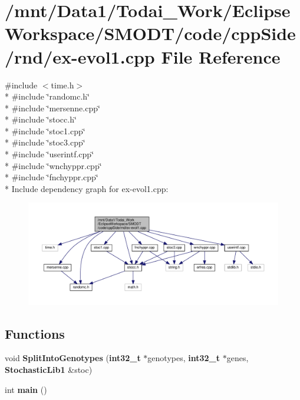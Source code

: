 \section{/mnt/\-Data1/\-Todai\-\_\-\-Work/\-Eclipse\-Workspace/\-S\-M\-O\-D\-T/code/cpp\-Side/rnd/ex-\/evol1.cpp File Reference}
\label{rnd_2ex-evol1_8cpp}
{\ttfamily \#include $<$time.\-h$>$}\\*
{\ttfamily \#include \char`\"{}randomc.\-h\char`\"{}}\\*
{\ttfamily \#include \char`\"{}mersenne.\-cpp\char`\"{}}\\*
{\ttfamily \#include \char`\"{}stocc.\-h\char`\"{}}\\*
{\ttfamily \#include \char`\"{}stoc1.\-cpp\char`\"{}}\\*
{\ttfamily \#include \char`\"{}stoc3.\-cpp\char`\"{}}\\*
{\ttfamily \#include \char`\"{}userintf.\-cpp\char`\"{}}\\*
{\ttfamily \#include \char`\"{}wnchyppr.\-cpp\char`\"{}}\\*
{\ttfamily \#include \char`\"{}fnchyppr.\-cpp\char`\"{}}\\*
Include dependency graph for ex-\/evol1.cpp\-:
\nopagebreak
\begin{figure}[H]
\begin{center}
\leavevmode
\includegraphics[width=350pt]{rnd_2ex-evol1_8cpp__incl}
\end{center}
\end{figure}
\subsection*{Functions}
\begin{DoxyCompactItemize}
\item 
void {\bf Split\-Into\-Genotypes} ({\bf int32\-\_\-t} $\ast$genotypes, {\bf int32\-\_\-t} $\ast$genes, {\bf Stochastic\-Lib1} \&stoc)
\item 
int {\bf main} ()
\end{DoxyCompactItemize}


